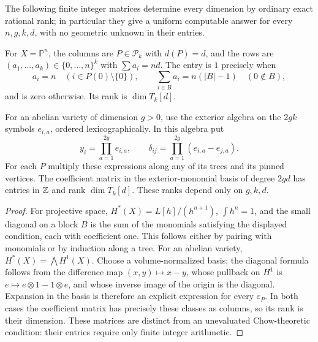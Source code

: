 \begin{proposition}
\label{c:other-dimensions}
The following finite integer matrices determine every dimension by ordinary exact rational rank; in particular they give a uniform computable answer for every $n,g,k,d$, with no geometric unknown in their entries.

For $X=\mathbb P^n$, the columns are $P\in\mathcal P_k$ with $d(P)=d$, and the rows are $(a_1,\ldots,a_k)\in\{0,\ldots,n\}^k$ with $\sum a_i=nd$. The entry is $1$ precisely when
\[
 a_i=n\quad(i\in P(0)\setminus\{0\}),\qquad
 \sum_{i\in B}a_i=n(|B|-1)\quad(0\notin B),
\]
and is zero otherwise. Its rank is $\dim T_k[d]$.

For an abelian variety of dimension $g>0$, use the exterior algebra on the $2gk$ symbols $e_{i,a}$, ordered lexicographically. In this algebra put
\[
 y_i=\prod_{a=1}^{2g}e_{i,a},\qquad
 \delta_{ij}=\prod_{a=1}^{2g}(e_{i,a}-e_{j,a}).
\]
For each $P$ multiply these expressions along any of its trees and its pinned vertices. The coefficient matrix in the exterior-monomial basis of degree $2gd$ has entries in $\mathbb Z$ and rank $\dim T_k[d]$. These ranks depend only on $g,k,d$.
\end{proposition}

\begin{proof}
For projective space, $H^*(X)=L[h]/(h^{n+1})$, $\int h^n=1$, and the small diagonal on a block $B$ is the sum of the monomials satisfying the displayed condition, each with coefficient one. This follows either by pairing with monomials or by induction along a tree. For an abelian variety, $H^*(X)=\bigwedge H^1(X)$. Choose a volume-normalized basis; the diagonal formula follows from the difference map $(x,y)\mapsto x-y$, whose pullback on $H^1$ is $e\mapsto e\otimes1-1\otimes e$, and whose inverse image of the origin is the diagonal. Expansion in the basis is therefore an explicit expression for every $\varepsilon_P$. In both cases the coefficient matrix has precisely these classes as columns, so its rank is their dimension. These matrices are distinct from an unevaluated Chow-theoretic condition: their entries require only finite integer arithmetic.
\end{proof}

